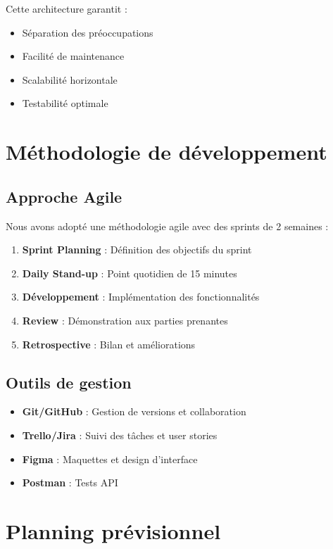 \documentclass[12pt,a4paper]{report}
\begin{document}
Cette architecture garantit :
\begin{itemize}
    \item Séparation des préoccupations
    \item Facilité de maintenance
    \item Scalabilité horizontale
    \item Testabilité optimale
\end{itemize}

\section{Méthodologie de développement}

\subsection{Approche Agile}

Nous avons adopté une méthodologie agile avec des sprints de 2 semaines :

\begin{enumerate}
    \item \textbf{Sprint Planning} : Définition des objectifs du sprint
    \item \textbf{Daily Stand-up} : Point quotidien de 15 minutes
    \item \textbf{Développement} : Implémentation des fonctionnalités
    \item \textbf{Review} : Démonstration aux parties prenantes
    \item \textbf{Retrospective} : Bilan et améliorations
\end{enumerate}

\subsection{Outils de gestion}

\begin{itemize}
    \item \textbf{Git/GitHub} : Gestion de versions et collaboration
    \item \textbf{Trello/Jira} : Suivi des tâches et user stories
    \item \textbf{Figma} : Maquettes et design d'interface
    \item \textbf{Postman} : Tests API
\end{itemize}

\section{Planning prévisionnel}
\end{document}
